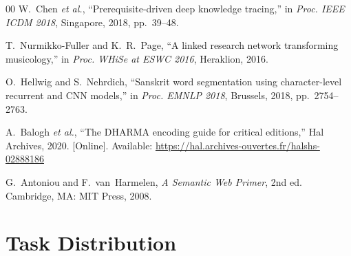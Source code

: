 \documentclass[conference]{IEEEtran}
\begin{document}
\begin{thebibliography}{00}
W.~Chen \textit{et al.},
``Prerequisite-driven deep knowledge tracing,''
in \textit{Proc. IEEE ICDM 2018}, Singapore, 2018, pp.~39--48.

T.~Nurmikko-Fuller and K.~R.~Page,
``A linked research network transforming musicology,''
in \textit{Proc. WHiSe at ESWC 2016}, Heraklion, 2016.

O.~Hellwig and S.~Nehrdich,
``Sanskrit word segmentation using character-level recurrent and CNN models,''
in \textit{Proc. EMNLP 2018}, Brussels, 2018, pp.~2754--2763.

A.~Balogh \textit{et al.},
``The DHARMA encoding guide for critical editions,''
Hal Archives, 2020.
[Online]. Available: \url{https://hal.archives-ouvertes.fr/halshs-02888186}

G.~Antoniou and F.~van~Harmelen,
\textit{A Semantic Web Primer}, 2nd ed.
Cambridge, MA: MIT Press, 2008.

\end{thebibliography}

\appendices

\section{Task Distribution}
\end{document}
